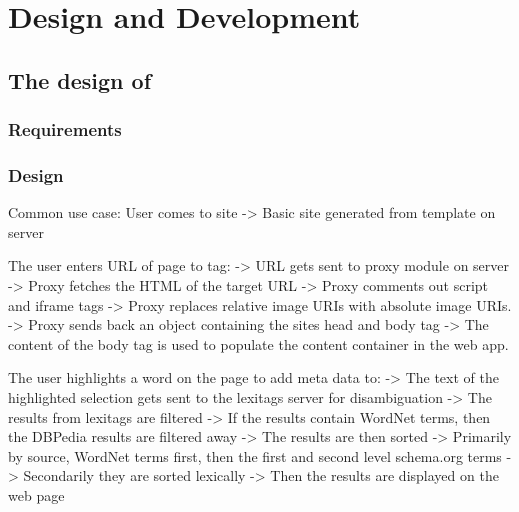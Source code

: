 
\chapter{Design and Development} %

\label{DesignAndDevelopment} %



\section{The design of \theartefact}



\subsection{Requirements}




\subsection{Design}
Common use case:
User comes to site -> Basic site generated from template on server

The user enters URL of page to tag:
	-> URL gets sent to proxy module on server
	-> Proxy fetches the HTML of the target URL
	-> Proxy comments out script and iframe tags
	-> Proxy replaces relative image URIs with absolute image URIs.
	-> Proxy sends back an object containing the sites head and body tag
	-> The content of the body tag is used to populate the content container in the web app.

The user highlights a word on the page to add meta data to:
	-> The text of the highlighted selection gets sent to the lexitags server for disambiguation
	-> The results from lexitags are filtered
		-> If the results contain WordNet terms, then the DBPedia results are filtered away
	-> The results are then sorted
		-> Primarily by source, WordNet terms first, then the first and second level schema.org terms
		-> Secondarily they are sorted lexically
	-> Then the results are displayed on the web page 

